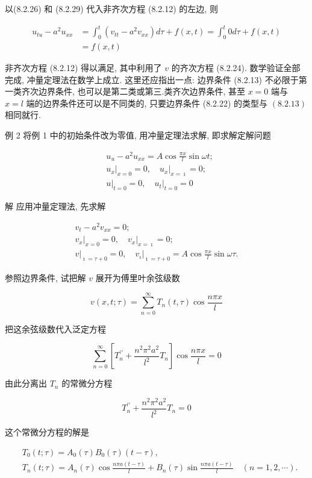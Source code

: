 \begin{solution}
以(8.2.26) 和 (8.2.29) 代入非齐次方程 (8.2.12) 的左边, 则

$$
\begin{aligned}
u_{t u}-a^{2} u_{x x} & =\int_{0}^{t}\left(v_{t t}-a^{2} v_{x x}\right) d \tau+f(x, t)=\int_{0}^{t} 0 d \tau+f(x, t) \\
& =f(x, t)
\end{aligned}
$$

非齐次方程 (8.2.12) 得以满足, 其中利用了 $v$ 的齐次方程 (8.2.24).
数学验证全部完成, 冲量定理法在数学上成立. 这里还应指出一点: 边界条件 (8.2.13) 不必限于第一类齐次边界条件, 也可以是第二类或第三.类齐次边界条件, 甚至 $x=0$ 端与 $x=l$ 端的边界条件还可以是不同类的, 只要边界条件 (8.2.22) 的类型与 $(8.2 .13)$ 相同就行.

例 2 将例 1 中的初始条件改为零值, 用冲量定理法求解, 即求解定解问题

$$
\begin{aligned}
& u_{u}-a^{2} u_{x x}=A \cos \frac{\pi x}{l} \sin \omega t ; \\
& \left.u_{x}\right|_{x=0}=0,\left.\quad u_{x}\right|_{x=\imath}=0 ; \\
& \left.u\right|_{t=0}=0,\left.\quad u_{t}\right|_{t=0}=0
\end{aligned}
$$

解 应用冲量定理法, 先求解

$$
\begin{gathered}
v_{t}-a^{2} v_{x x}=0 ; \\
\left.v_{x}\right|_{x=0}=0,\left.\quad v_{x}\right|_{x=\imath}=0 ; \\
\left.v\right|_{\imath=\tau+0}=0,\left.\quad v_{\iota}\right|_{\imath=\tau+0}=A \cos \frac{\pi x}{l} \sin \omega \tau .
\end{gathered}
$$

参照边界条件, 试把解 $v$ 展开为傅里叶余弦级数

$$
v(x, t ; \tau)=\sum_{n=0}^{\infty} T_{n}(t, \tau) \cos \frac{n \pi x}{l}
$$

把这余弦级数代入泛定方程

$$
\sum_{n=0}^{\infty}\left[T_{n}^{\prime \prime}+\frac{n^{2} \pi^{2} a^{2}}{l^{2}} T_{n}\right] \cos \frac{n \pi x}{l}=0
$$

由此分离出 $T_{n}$ 的常微分方程

$$
T_{n}^{\prime \prime}+\frac{n^{2} \pi^{2} a^{2}}{l^{2}} T_{n}=0
$$

这个常微分方程的解是

$$
\begin{aligned}
& T_{0}(t ; \tau)=A_{0}(\tau) B_{0}(\tau)(t-\tau), \\
& T_{n}(t ; \tau)=A_{n}(\tau) \cos \frac{n \pi a(t-\tau)}{l}+B_{n}(\tau) \sin \frac{n \pi a(t-\tau)}{l} \quad(n=1,2, \cdots) .
\end{aligned}
$$


\end{solution}
